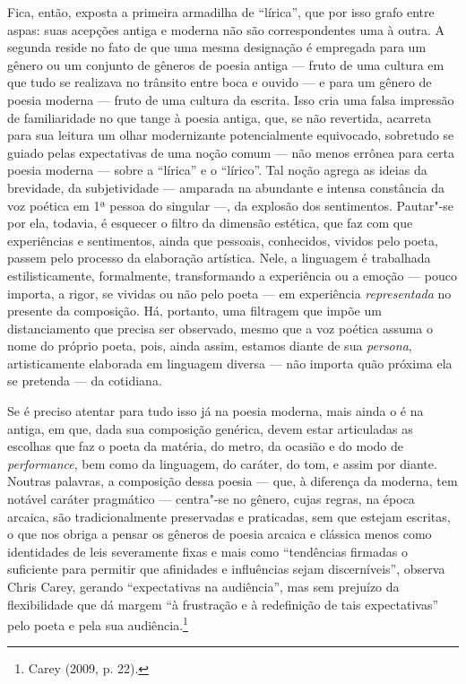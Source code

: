 Fica, então, exposta a primeira armadilha de “lírica”, que por isso grafo
entre aspas: suas acepções antiga e moderna não são correspondentes uma
à outra. A segunda reside no fato de que uma mesma designação é empregada para
um gênero ou um conjunto de gêneros de poesia antiga --- fruto de uma cultura em
que tudo se realizava no trânsito entre boca e ouvido --- e para um gênero de
poesia moderna --- fruto de uma cultura da escrita. Isso cria uma falsa impressão
de familiaridade no que tange à poesia antiga, que, se não revertida, acarreta
para sua leitura um olhar modernizante potencialmente equivocado, sobretudo se
guiado pelas expectativas de uma noção comum --- não menos errônea para certa
poesia moderna --- sobre a “lírica” e o “lírico”. Tal noção agrega as ideias da
brevidade, da subjetividade --- amparada na abundante e intensa constância da voz
poética em 1ª pessoa do singular ---, da explosão dos sentimentos. Pautar"-se por
ela, todavia, é esquecer o filtro da dimensão estética, que faz com que
experiências e sentimentos, ainda que pessoais, conhecidos, vividos pelo poeta,
passem pelo processo da elaboração artística. Nele, a linguagem é trabalhada
estilisticamente, formalmente, transformando a experiência ou a emoção --- pouco
importa, a rigor, se vividas ou não pelo poeta --- em experiência
\textit{representada} no presente da composição. Há, portanto, uma filtragem
que impõe um distanciamento que precisa ser observado, mesmo que a voz poética
assuma o nome do próprio poeta, pois, ainda assim, estamos diante de sua
\textit{persona}, artisticamente elaborada em linguagem diversa --- não importa
quão próxima ela se pretenda --- da cotidiana.

Se é preciso atentar para tudo isso já na poesia moderna, mais ainda o é na antiga, em que, dada sua composição genérica, devem
estar articuladas as escolhas que faz o poeta da matéria, do metro, da ocasião
e do modo de \textit{performance}, bem como da linguagem, do caráter, do tom, e
assim por diante. Noutras palavras, a composição dessa poesia --- que, à diferença
da moderna, tem notável caráter pragmático --- centra"-se no gênero, cujas regras,
na época arcaica, são tradicionalmente preservadas e praticadas, sem que
estejam escritas, o que nos obriga a pensar os gêneros de poesia arcaica e
clássica menos como identidades de leis severamente fixas e mais como
“tendências firmadas o suficiente para permitir que afinidades e influências
sejam discerníveis”, observa Chris Carey, gerando
“expectativas na audiência”, mas sem prejuízo da flexibilidade que dá margem “à
frustração e à redefinição de tais expectativas” pelo poeta e pela sua
audiência.\footnote{ Carey (2009, p. 22).}

